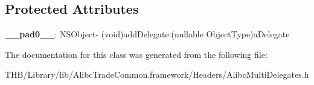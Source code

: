 \subsection*{Protected Attributes}
\begin{DoxyCompactItemize}
\item 
\mbox{\label{interface_alibc_multi_delegates_af74348600b71a089744fef0db3b440ef}} 
{\bfseries \+\_\+\+\_\+pad0\+\_\+\+\_\+}\+: N\+S\+Object-\/ (void)add\+Delegate\+:(nullable Object\+Type)a\+Delegate
\end{DoxyCompactItemize}


The documentation for this class was generated from the following file\+:\begin{DoxyCompactItemize}
\item 
T\+H\+B/\+Library/lib/\+Alibc\+Trade\+Common.\+framework/\+Headers/Alibc\+Multi\+Delegates.\+h\end{DoxyCompactItemize}
